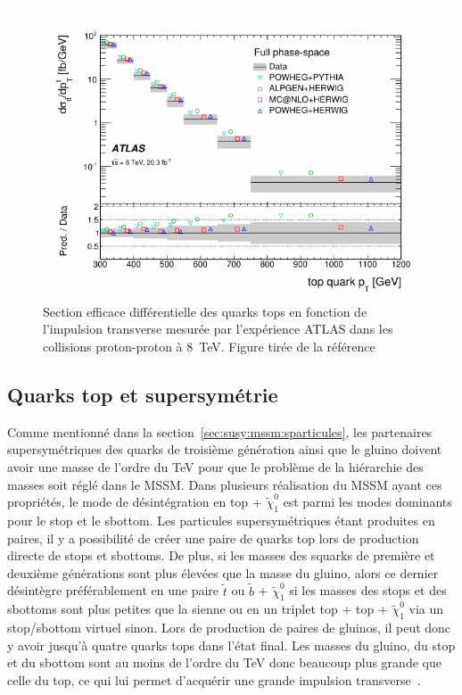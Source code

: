 \begin{figure}
  \centering
  \includegraphics{boosted_top_pt.pdf}
  \caption{Section efficace différentielle des quarks tops en fonction
    de l'impulsion transverse mesurée par l'expérience ATLAS dans les
    collisions proton-proton à 8~TeV. Figure tirée de la
    référence~\cite{atlas_collaboration_measurement_2015}}
  \label{fig:boosted_top_pt}
\end{figure}

\subsection{Quarks top et supersymétrie}
\label{sec:top:boosted:susy}

Comme mentionné dans la section~\ref{sec:susy:mssm:sparticules}, les
partenaires supersymétriques des quarks de troisième génération ainsi
que le gluino doivent avoir une masse de l'ordre du TeV pour que le
problème de la hiérarchie des masses soit réglé dans le MSSM.  Dans
plusieurs réalisation du MSSM ayant ces propriétés, le mode de
désintégration en top + $\tilde{\chi}_1^0$ est parmi les modes
dominants pour le stop et le sbottom. Les particules supersymétriques
étant produites en paires, il y a possibilité de créer une paire de
quarks top lors de production directe de stops et sbottoms. De plus,
si les masses des squarks de première et deuxième générations sont
plus élevées que la masse du gluino, alors ce dernier désintègre
préférablement en une paire $\tilde{t}$ ou $\tilde{b}$ +
$\tilde{\chi}_1^0$ si les masses des stops et des sbottoms sont plus
petites que la sienne ou en un triplet top + top + $\tilde{\chi}_1^0$
via un stop/sbottom virtuel sinon.  Lors de production de paires de
gluinos, il peut donc y avoir jusqu'à quatre quarks tops dans l'état
final. Les masses du gluino, du stop et du sbottom sont au moins de
l'ordre du TeV donc beaucoup plus grande que celle du top, ce qui lui
permet d'acquérir une grande impulsion
transverse~\cite{bandyopadhyay_boosted_2011}.

